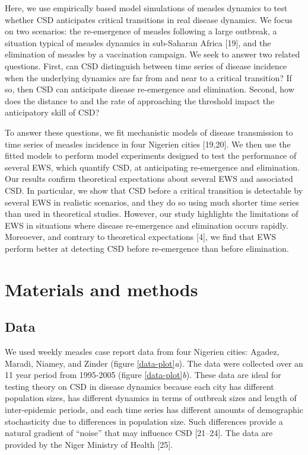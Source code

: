 \documentclass[3p]{elsarticle} %
\begin{document}
Here, we use empirically based model simulations of measles dynamics to
test whether CSD anticipates critical transitions in real disease
dynamics. We focus on two scenarios: the re-emergence of measles
following a large outbreak, a situation typical of measles dynamics in
sub-Saharan Africa {[}19{]}, and the elimination of measles by a
vaccination campaign. We seek to answer two related questions. First,
can CSD distinguish between time series of disease incidence when the
underlying dynamics are far from and near to a critical transition? If
so, then CSD can anticipate disease re-emergence and elimination.
Second, how does the distance to and the rate of approaching the
threshold impact the anticipatory skill of CSD?

To answer these questions, we fit mechanistic models of disease
transmission to time series of measles incidence in four Nigerien cities
{[}19,20{]}. We then use the fitted models to perform model experiments
designed to test the performance of several EWS, which quantify CSD, at
anticipating re-emergence and elimination. Our results confirm
theoretical expectations about several EWS and associated CSD. In
particular, we show that CSD before a critical transition is detectable
by several EWS in realistic scenarios, and they do so using much shorter
time series than used in theoretical studies. However, our study
highlights the limitations of EWS in situations where disease
re-emergence and elimination occurs rapidly. Moreoever, and contrary to
theoretical expectations {[}4{]}, we find that EWS perform better at
detecting CSD before re-emergence than before elimination.

\ignorespaces

\hypertarget{materials-and-methods}{%
\section{Materials and methods}\label{materials-and-methods}}

\hypertarget{data}{%
\subsection{Data}\label{data}}

We used weekly measles case report data from four Nigerien cities:
Agadez, Maradi, Niamey, and Zinder (figure \ref{data-plot}\emph{a}). The
data were collected over an 11 year period from 1995-2005 (figure
\ref{data-plot}\emph{b}). These data are ideal for testing theory on CSD
in disease dynamics because each city has different population sizes,
has different dynamics in terms of outbreak sizes and length of
inter-epidemic periods, and each time series has different amounts of
demographic stochasticity due to differences in population size. Such
differences provide a natural gradient of ``noise'' that may influence
CSD {[}21--24{]}. The data are provided by the Niger Ministry of Health
{[}25{]}.
\end{document}
